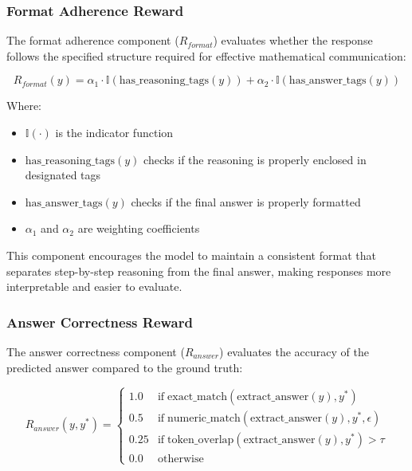 \documentclass[11pt,a4paper]{article}
\begin{document}
\subsubsection{Format Adherence Reward}

The format adherence component ($R_{format}$) evaluates whether the response follows the specified structure required for effective mathematical communication:

\begin{equation}
R_{format}(y) = \alpha_1 \cdot \mathbb{I}(\text{has\_reasoning\_tags}(y)) + \alpha_2 \cdot \mathbb{I}(\text{has\_answer\_tags}(y))
\end{equation}

Where:
\begin{itemize}
    \item $\mathbb{I}(\cdot)$ is the indicator function
    \item $\text{has\_reasoning\_tags}(y)$ checks if the reasoning is properly enclosed in designated tags
    \item $\text{has\_answer\_tags}(y)$ checks if the final answer is properly formatted
    \item $\alpha_1$ and $\alpha_2$ are weighting coefficients
\end{itemize}

This component encourages the model to maintain a consistent format that separates step-by-step reasoning from the final answer, making responses more interpretable and easier to evaluate.

\subsubsection{Answer Correctness Reward}

The answer correctness component ($R_{answer}$) evaluates the accuracy of the predicted answer compared to the ground truth:

\begin{equation}
R_{answer}(y, y^*) = \begin{cases}
1.0 & \text{if}\;\text{exact\_match}(\text{extract\_answer}(y), y^*) \\
0.5 & \text{if}\;\text{numeric\_match}(\text{extract\_answer}(y), y^*, \epsilon) \\
0.25 & \text{if}\;\text{token\_overlap}(\text{extract\_answer}(y), y^*) > \tau \\
0.0 & \text{otherwise}
\end{cases}
\end{equation}
\end{document}
